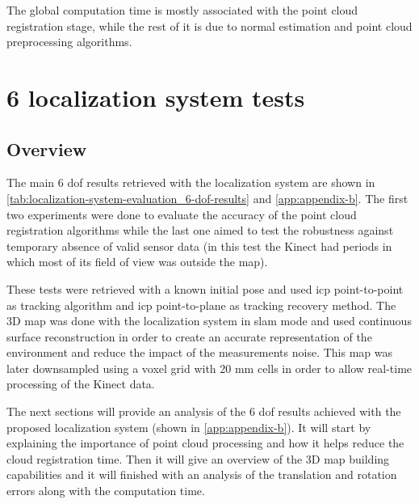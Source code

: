 The global computation time is mostly associated with the point cloud registration stage, while the rest of it is due to normal estimation and point cloud preprocessing algorithms.



\clearpage

\section{6  localization system tests}

\subsection{Overview}

The main 6 \gls{dof} results retrieved with the localization system are shown in \cref{tab:localization-system-evaluation_6-dof-results} and \cref{app:appendix-b}. The first two experiments were done to evaluate the accuracy of the point cloud registration algorithms while the last one aimed to test the robustness against temporary absence of valid sensor data (in this test the Kinect had periods in which most of its field of view was outside the map).

These tests were retrieved with a known initial pose and used \gls{icp} point-to-point as tracking algorithm and \gls{icp} point-to-plane as tracking recovery method. The 3D map was done with the localization system in \gls{slam} mode and used continuous surface reconstruction in order to create an accurate representation of the environment and reduce the impact of the measurements noise. This map was later downsampled using a voxel grid with 20 mm cells in order to allow real-time processing of the Kinect data.

The next sections will provide an analysis of the 6 \gls{dof} results achieved with the proposed localization system (shown in \cref{app:appendix-b}). It will start by explaining the importance of point cloud processing and how it helps reduce the cloud registration time. Then it will give an overview of the 3D map building capabilities and it will finished with an analysis of the translation and rotation errors along with the computation time.


